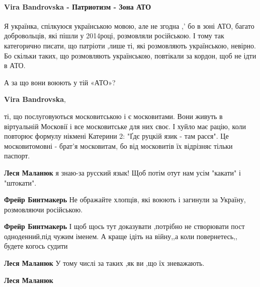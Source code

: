  
 
 
 
 

\paragraph{Vira Bandrovska - Патриотизм - Зона АТО}

\begin{itemize} %

Я українка, спілкуюся українською мовою, але не згодна ,' бо в зоні АТО, багато
добровольців, які пішли у 2014році, розмовляли російською. І тому так категорично
писати, що патріоти ,лише ті, які розмовляють українською, невірно. Бо скільки
таких, що розмовляють українською, повтікали за кордон, щоб не ідти в АТО.

\begin{itemize} %
А за що вони воюють у тій «АТО»?

\textbf{Vira Bandrovska}, 

ті, що послуговуються московитською і є московитами. Вони живуть в віртуальній
Московії і все московитське для них своє. І хуйло має рацію, коли повторює
формулу нікмені Катерини 2: "Ґдє руцкій язик - там расєя". Це московитомовні -
брат'я московитам, бо від московитів їх відрізняє тільки паспорт.

\textbf{Леся Маланюк} я знаю-за русский язык! Щоб потім отут нам усім "какати" і "штокати".

\textbf{Фрейр Бинтмакерь} Не ображайте хлопців, які воюють і загинули за Україну, розмовляючи російською.

\textbf{Фрейр Бинтмакерь} І щоб щось тут доказувати ,потрібно не створювати пост одноденний,під чужим іменем. А краще ідіть на війну,,а коли повернетесь,, будете когось судити

\textbf{Леся Маланюк} У тому числі за таких ,як ви ,що їх зневажають.

\textbf{Леся Маланюк} 


\end{itemize}
\end{itemize}
